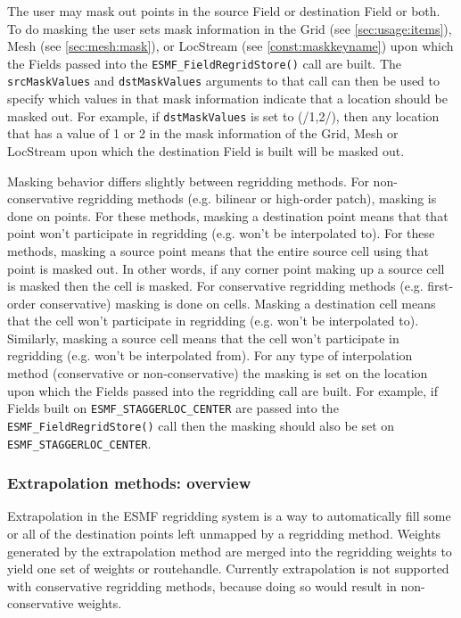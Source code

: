 The user may mask out points in the source
Field or destination Field or both. To do masking the user sets
mask information in the Grid (see \ref{sec:usage:items}), Mesh
(see \ref{sec:mesh:mask}), or LocStream (see \ref{const:maskkeyname})
upon which the Fields passed into the
{\tt ESMF\_FieldRegridStore()} call are built. The {\tt srcMaskValues}
and {\tt dstMaskValues} arguments to that
call can then be used to specify which values in that mask
information indicate that a location should be masked out. For
example, if {\tt dstMaskValues} is set to (/1,2/), then any location that
has a value of 1 or 2 in the mask information of the Grid, Mesh or LocStream
upon which the destination Field is built will be masked out.

Masking behavior differs slightly between regridding methods. For
non-conservative regridding methods (e.g. bilinear or high-order
patch), masking is done on points. For these methods, masking a
destination point means that that point won't participate in
regridding (e.g. won't be interpolated to). For these methods,
masking a source point means that the entire source cell using
that point is masked out. In other words, if any corner point
making up a source cell is masked then the cell is masked. For
conservative regridding methods (e.g. first-order conservative)
masking is done on cells. Masking a destination cell means that
the cell won't participate in regridding (e.g. won't be
interpolated to). Similarly, masking a source cell means that the
cell won't participate in regridding (e.g. won't be interpolated
from).  For any type of interpolation method (conservative or
non-conservative) the masking is set on the location upon
which the Fields passed into the regridding call are built.
For example, if Fields built on  {\tt ESMF\_STAGGERLOC\_CENTER} are
passed into the {\tt ESMF\_FieldRegridStore()} call then the masking
should also be set on {\tt ESMF\_STAGGERLOC\_CENTER}.

\subsubsection{Extrapolation methods: overview}\label{sec:extrapolation:overview}

Extrapolation in the ESMF regridding system is a way to automatically fill some or all of the 
destination points left unmapped by a regridding method. Weights generated by
the extrapolation method are merged into the regridding weights to yield one set of weights or 
routehandle. Currently extrapolation is not supported with conservative regridding methods, because 
doing so would result in non-conservative weights. 

